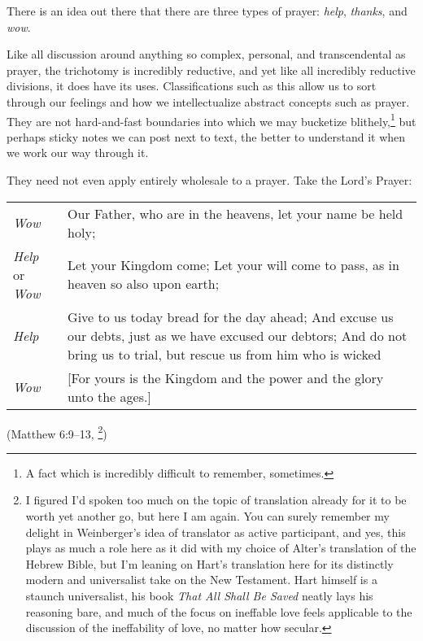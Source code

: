 There is an idea out there that there are three types of prayer: \emph{help}, \emph{thanks}, and \emph{wow}. \parencite{helpthankswow}

Like all discussion around anything so complex, personal, and transcendental as prayer, the trichotomy is incredibly reductive, and yet like all incredibly reductive divisions, it does have its uses. Classifications such as this allow us to sort through our feelings and how we intellectualize abstract concepts such as prayer. They are not hard-and-fast boundaries into which we may bucketize blithely,\footnote{A fact which is incredibly difficult to remember, sometimes.} but perhaps sticky notes we can post next to text, the better to understand it when we work our way through it.

They need not even apply entirely wholesale to a prayer. Take the Lord's Prayer:

\newlength{\tRemainder}
\noindent\begin{tabular}{@{}>{\raggedleft\arraybackslash}p{} p{\tRemainder}}
\emph{Wow} &
Our Father, who are in the heavens, let your name be held holy; \\
\emph{Help} or \emph{Wow} &
Let your Kingdom come; Let your will come to pass, as in heaven so also upon earth; \\
\emph{Help} &
Give to us today bread for the day ahead; And excuse us our debts, just as we have excused our debtors; And do not bring us to trial, but rescue us from him who is wicked \\
\emph{Wow} &
{[}For yours is the Kingdom and the power and the glory unto the ages.{]}
\end{tabular}

\noindent(Matthew 6:9--13, \cite[10]{dbh-nt}\footnote{I figured I'd spoken too much on the topic of translation already for it to be worth yet another go, but here I am again. You can surely remember my delight in Weinberger's idea of translator as active participant, and yes, this plays as much a role here as it did with my choice of Alter's translation of the Hebrew Bible, but I'm leaning on Hart's translation here for its distinctly modern and universalist take on the New Testament. Hart himself is a staunch universalist, his book \emph{That All Shall Be Saved} neatly lays his reasoning bare, and much of the focus on ineffable love feels applicable to the discussion of the ineffability of love, no matter how secular.})
